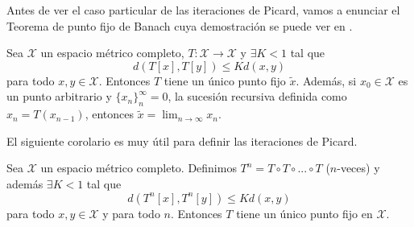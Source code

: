 Antes de ver el caso particular de las iteraciones de Picard, vamos a enunciar el Teorema de punto fijo de Banach cuya demostración se puede ver en \cite{Amster}.
\begin{thm}
Sea $\mathcal{X}$ un espacio métrico completo, $T:\mathcal{X}\to \mathcal{X}$ y  $\exists K<1$ tal que 
\begin{equation*}
    d(T[x],T[y])\leq Kd(x,y)    
\end{equation*}
para todo $x,y\in \mathcal{X}$. Entonces $T$ tiene un único punto fijo $\tilde{x}$. Además, si $x_0\in \mathcal{X}$ es un punto arbitrario y $\{x_{n}\}_n^\infty=0$, la sucesión recursiva definida como   $x_n=T(x_{n-1})$, entonces $\tilde{x}=\lim_{n\to \infty}x_n$.
\end{thm}
El siguiente corolario es muy útil para definir las iteraciones de Picard.
\begin{cor}\label{col:picard}
Sea $\mathcal{X}$ un espacio métrico completo. Definimos  $T^n=T\circ T\circ ...\circ T$ ($n$-veces) y además $\exists K<1$ tal que 
    \begin{equation*}
    d(T^n[x],T^n[y])\leq Kd(x,y)    
    \end{equation*}
para todo $x,y\in \mathcal{X}$ y para todo $n$. Entonces $T$ tiene un único punto fijo en $\mathcal{X}$.
\end{cor}

